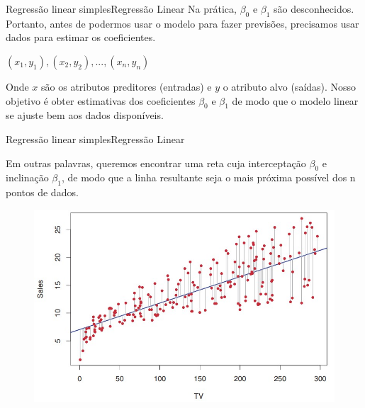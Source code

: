 \documentclass[t]{beamer}
\begin{document}

\begin{ftst}{Regressão linear simples}{Regressão Linear}
Na prática, $\beta_0$ e $\beta_1$ são desconhecidos. Portanto, antes de podermos usar o modelo para fazer previsões, precisamos usar dados para estimar os coeficientes.

\begin{center}
    $(x_1,y_1),(x_2,y_2), ..., (x_n,y_n)$
\end{center}
\vone
Onde $x$ são os atributos preditores (entradas) e $y$ o atributo alvo (saídas).
\vone
Nosso objetivo é obter estimativas dos coeficientes $\beta_0$ e $\beta_1$ de modo que o modelo linear se ajuste bem aos dados disponíveis.

\end{ftst}


\begin{ftst}{Regressão linear simples}{Regressão Linear}

Em outras palavras, queremos encontrar uma reta cuja interceptação $\beta_0$ e inclinação $\beta_1$, de modo que a linha resultante seja o mais próxima possível dos n pontos de dados.

\begin{figure}
    \centering
    \includegraphics[scale=0.4]{Figuras/slide05_02.jpg}
\end{figure}


\end{ftst}

\end{document}
